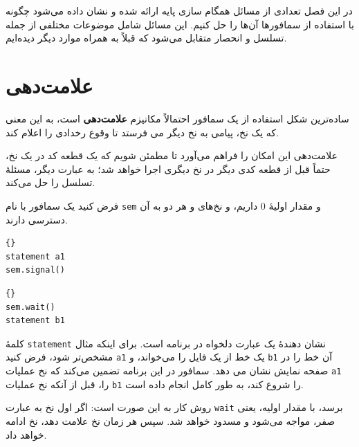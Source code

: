 \documentclass{book}
\begin{document}
در این فصل تعدادی از مسائل همگام سازی پایه ارائه شده و نشان داده می‌شود چگونه با استفاده از سمافورها آن‌ها را حل کنیم. 
این مسائل شامل موضوعات مختلفی  از جمله تسلسل و انحصار متقابل می‌شود که قبلاً به همراه موارد دیگر دیده‌ایم.

\section{علامت‌دهی}

ساده‌ترین شکل استفاده از یک سمافور احتمالاً مکانیزم \textbf{علامت‌دهی}  است، 
به این معنی که یک نخ، پیامی به نخ دیگر می فرستد تا وقوع رخدادی را اعلام کند.

علامت‌دهی این امکان را فراهم می‌آورد تا مطمئن شویم که یک قطعه کد در یک نخ، حتماً قبل از قطعه کدی دیگر در نخ دیگری اجرا خواهد شد؛ به عبارت دیگر، مسئلهٔ تسلسل را حل می‌کند.

فرض کنید یک سمافور با نام \texttt{sem} و مقدار اولیهٔ  $0$ داریم، و نخ‌های  و  هر دو به آن دسترسی دارند.

\begin{latin}
\begin{minipage}[t]{2in}
\begin{latin}
\begin{lstlisting}[title=\rl{نخ \lr{A}}]{}
statement a1
sem.signal()
\end{lstlisting}
\end{latin}
\end{minipage}
\hfill
\begin{minipage}[t]{2in}
\begin{latin}
\begin{lstlisting}[title=\rl{نخ \lr{B}}]{}
sem.wait()
statement b1
\end{lstlisting}
\end{latin}
\end{minipage}
\end{latin}

کلمهٔ \texttt{statement} نشان دهندهٔ یک عبارت دلخواه در برنامه است. برای اینکه مثال مشخص‌تر شود، فرض کنید \texttt{a1}
یک خط از یک فایل را می‌خواند، و \texttt{b1} آن خط را در صفحه نمایش نشان می دهد. سمافور در این برنامه تضمین می‌کند که 
نخ  عملیات \texttt{a1} را، قبل از آنکه نخ  عملیات \texttt{b1} را شروع کند، به طور کامل انجام داده است.

روش کار به این صورت است: اگر اول نخ  به عبارت \texttt{wait} برسد، با مقدار اولیه، یعنی صفر، مواجه می‌شود 
و مسدود خواهد شد. سپس هر زمان نخ  علامت دهد، نخ  ادامه خواهد داد.
\end{document}
